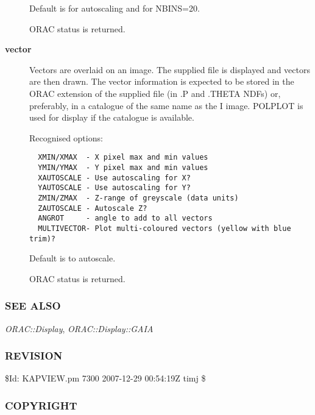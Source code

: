 \begin{description}
Default is for autoscaling and for NBINS=20.



ORAC status is returned.


\item[{\textbf{vector}}] \mbox{}

Vectors are overlaid on an image. The supplied file is displayed
and vectors are then drawn. The vector information is expected
to be stored in the ORAC extension of the supplied file
(in .P and .THETA NDFs) or, preferably, in a catalogue of the
same name as the I image. POLPLOT is used for display if
the catalogue is available.



Recognised options:

\begin{verbatim}
  XMIN/XMAX  - X pixel max and min values
  YMIN/YMAX  - Y pixel max and min values
  XAUTOSCALE - Use autoscaling for X?
  YAUTOSCALE - Use autoscaling for Y?
  ZMIN/ZMAX  - Z-range of greyscale (data units)
  ZAUTOSCALE - Autoscale Z?
  ANGROT     - angle to add to all vectors
  MULTIVECTOR- Plot multi-coloured vectors (yellow with blue trim)?
\end{verbatim}


Default is to autoscale.



ORAC status is returned.

\end{description}
\subsubsection*{SEE ALSO\label{ORAC::Display::KAPVIEW_SEE_ALSO}}


\emph{ORAC::Display}, \emph{ORAC::Display::GAIA}

\subsubsection*{REVISION\label{ORAC::Display::KAPVIEW_REVISION}}


\$Id: KAPVIEW.pm 7300 2007-12-29 00:54:19Z timj \$

\subsubsection*{COPYRIGHT\label{ORAC::Display::KAPVIEW_COPYRIGHT}}


